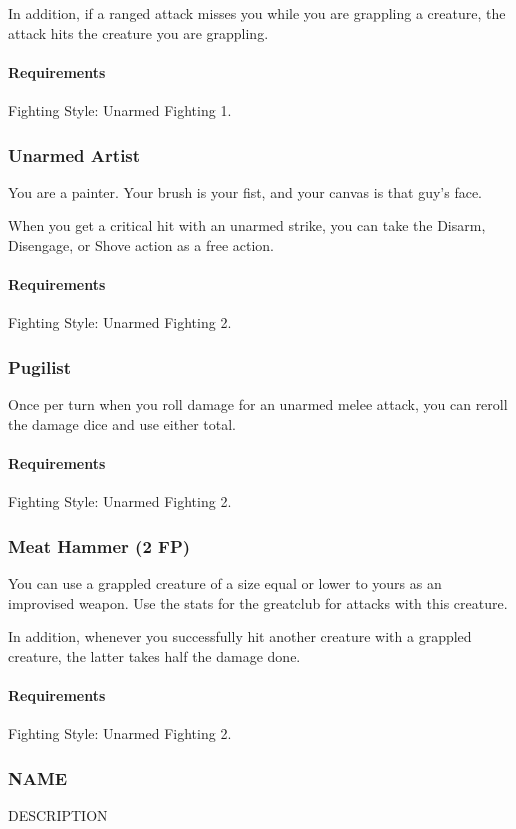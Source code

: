    In addition, if a ranged attack misses you while you are grappling a creature, the attack hits the creature you are grappling.
    \paragraph{Requirements} Fighting Style: Unarmed Fighting 1.
\subsubsection{Unarmed Artist} \label{feat::unarmedartist}
    You are a painter.
    Your brush is your fist, and your canvas is that guy's face.

    When you get a critical hit with an unarmed strike, you can take the Disarm, Disengage, or Shove action as a free action.
    \paragraph{Requirements} Fighting Style: Unarmed Fighting 2.
\subsubsection{Pugilist} \label{feat::pugilist}
    Once per turn when you roll damage for an unarmed melee attack, you can reroll the damage dice and use either total.
    \paragraph{Requirements} Fighting Style: Unarmed Fighting 2.
\subsubsection{Meat Hammer (2 FP)} \label{feat::meathammer}
    You can use a grappled creature of a size equal or lower to yours as an improvised weapon.
    Use the stats for the greatclub for attacks with this creature.

    In addition, whenever you successfully hit another creature with a grappled creature, the latter takes half the damage done.
    \paragraph{Requirements} Fighting Style: Unarmed Fighting 2.
\subsubsection{NAME} \label{feat::name}
    DESCRIPTION

